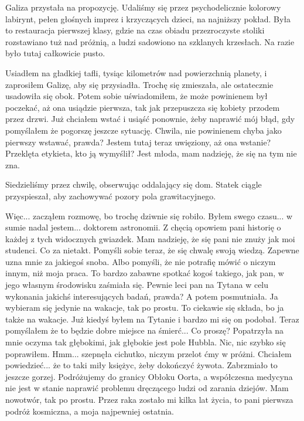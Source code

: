 Galiza przystała na propozycję.
Udaliśmy się przez psychodelicznie kolorowy labirynt, pełen głośnych imprez i krzyczących dzieci, na najniższy pokład.
Była to restauracja pierwszej klasy, gdzie na czas obiadu przezroczyste stoliki rozstawiano tuż nad próżnią, a ludzi sadowiono na szklanych krzesłach.
Na razie było tutaj całkowicie pusto.

Usiadłem na gładkiej tafli, tysiąc kilometrów nad powierzchnią planety, i zaprosiłem Galizę, aby się przysiadła. Trochę się zmieszała, ale ostatecznie usadowiła się obok.
Potem sobie uświadomiłem, że może powinienem był poczekać, aż ona usiądzie pierwsza, tak jak przepuszcza się kobiety przodem przez drzwi.
Już chciałem wstać i usiąść ponownie, żeby naprawić mój błąd, gdy pomyślałem że pogorszę jeszcze sytuację.
Chwila, nie powinienem chyba jako pierwszy wstawać, prawda? Jestem tutaj teraz uwięziony, aż ona wstanie? Przeklęta etykieta, kto ją wymyślił?
Jest młoda, mam nadzieję, że się na tym nie zna.

Siedzieliśmy przez chwilę, obserwując oddalający się dom. Statek ciągle przyspieszał, aby zachowywać pozory pola grawitacyjnego.

\begin{dialogue}
	\ds{} Więc... \dm{} zacząłem rozmowę, bo trochę dziwnie się robiło. \dm{} Byłem swego czasu... w sumie nadal jestem... doktorem astronomii.
		Z chęcią opowiem pani historię o każdej z tych widocznych gwiazdek. Mam nadzieję, że się pani nie znuży jak moi studenci. \dm{} Co za nietakt. Pomyśli sobie teraz, że się chwalę swoją wiedzą.
		Zapewne uzna mnie za jakiegoś snoba. Albo pomyśli, że nie potrafię mówić o niczym innym, niż moja praca.
	\ds{} To bardzo zabawne spotkać kogoś takiego, jak pan, w jego własnym środowisku \dm{} zaśmiała się. \dm{}
		 Pewnie leci pan na Tytana w celu wykonania jakichś interesujących badań, prawda? \dm{} A potem posmutniała. \dm{} Ja wybieram się jedynie na wakacje, tak po prostu.
	\ds{} To ciekawie się składa, bo ja także na wakacje. Już kiedyś byłem na Tytanie i bardzo mi się on podobał. 
		Teraz pomyślałem że to będzie dobre miejsce na śmierć...
	\ds{} Co proszę? \dm{} Popatrzyła na mnie oczyma tak głębokimi, jak głębokie jest pole Hubbla.
	\ds{} Nic, nic \dm{} szybko się poprawiłem.
	\ds{} Hmm... \dm{} szepnęła cichutko, niczym przelot ćmy w próżni.
	\ds{} Chciałem powiedzieć... że to taki miły księżyc, żeby dokończyć żywota. \dm{} Zabrzmiało to jeszcze gorzej. 
		\dm{} Podróżujemy do granicy Obłoku Oorta, a współczesna medycyna nie jest w stanie naprawić problemu dręczącego ludzi od zarania dziejów. 
		Mam nowotwór, tak po prostu. Przez raka zostało mi kilka lat życia, to pani pierwsza podróż kosmiczna, a moja najpewniej ostatnia.
\end{dialogue}


